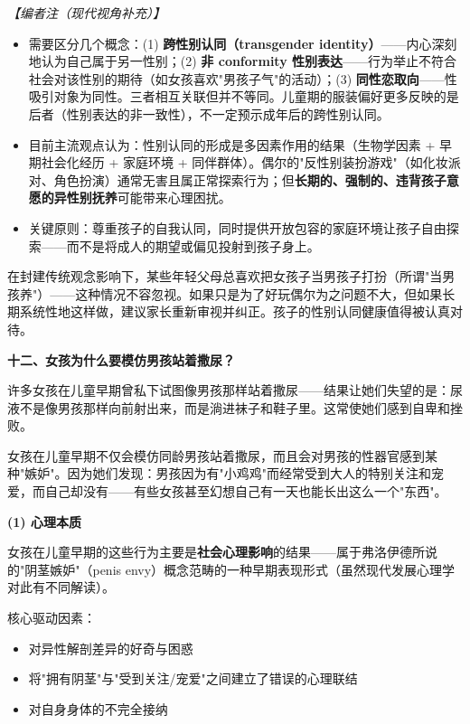 \begin{enumerate}
\vspace{0.3em}
\noindent\textit{【编者注（现代视角补充）】}
\begin{itemize}
	\item 需要区分几个概念：(1) \textbf{跨性别认同（transgender identity）}——内心深刻地认为自己属于另一性别；(2) \textbf{非 conformity 性别表达}——行为举止不符合社会对该性别的期待（如女孩喜欢"男孩子气"的活动）；(3) \textbf{同性恋取向}——性吸引对象为同性。三者相互关联但并不等同。儿童期的服装偏好更多反映的是后者（性别表达的非一致性），不一定预示成年后的跨性别认同。
	\item 目前主流观点认为：性别认同的形成是多因素作用的结果（生物学因素 + 早期社会化经历 + 家庭环境 + 同伴群体）。偶尔的"反性别装扮游戏"（如化妆派对、角色扮演）通常无害且属正常探索行为；但\textbf{长期的、强制的、违背孩子意愿的异性别抚养}可能带来心理困扰。
	\item 关键原则：尊重孩子的自我认同，同时提供开放包容的家庭环境让孩子自由探索——而不是将成人的期望或偏见投射到孩子身上。
\end{itemize}

\begin{tcolorbox}[colback=pink!5!white,colframe=red!50!black,title=贴心小叮咛]
在封建传统观念影响下，某些年轻父母总喜欢把女孩子当男孩子打扮（所谓"当男孩养"）——这种情况不容忽视。如果只是为了好玩偶尔为之问题不大，但如果长期系统性地这样做，建议家长重新审视并纠正。孩子的性别认同健康值得被认真对待。
\end{tcolorbox}

\vspace{0.8em}
\noindent\textbf{十二、女孩为什么要模仿男孩站着撒尿？}

许多女孩在儿童早期曾私下试图像男孩那样站着撒尿——结果让她们失望的是：尿液不是像男孩那样向前射出来，而是淌进袜子和鞋子里。这常使她们感到自卑和挫败。

女孩在儿童早期不仅会模仿同龄男孩站着撒尿，而且会对男孩的性器官感到某种"嫉妒"。因为她们发现：男孩因为有"小鸡鸡"而经常受到大人的特别关注和宠爱，而自己却没有——有些女孩甚至幻想自己有一天也能长出这么一个"东西"。

\vspace{0.3em}
\noindent\textbf{(1) 心理本质}

女孩在儿童早期的这些行为主要是\textbf{社会心理影响}的结果——属于弗洛伊德所说的"阴茎嫉妒"（penis envy）概念范畴的一种早期表现形式（虽然现代发展心理学对此有不同解读）。

核心驱动因素：
\begin{itemize}
	\item 对异性解剖差异的好奇与困惑
	\item 将"拥有阴茎"与"受到关注/宠爱"之间建立了错误的心理联结
	\item 对自身身体的不完全接纳
\end{itemize}


\end{enumerate}
